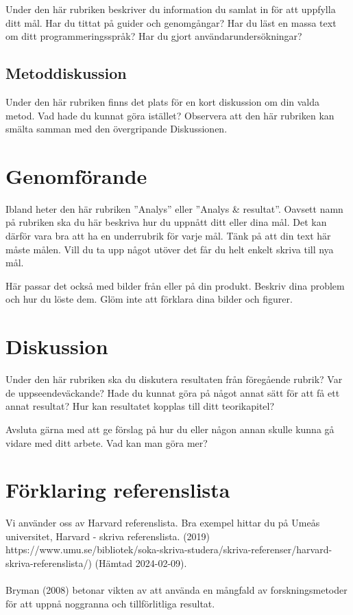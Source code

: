 \documentclass[12pt]{article}
\begin{document}
Under den här rubriken beskriver du information du samlat in för att uppfylla ditt mål. Har du tittat på guider och genomgångar? Har du läst en massa text om ditt programmeringsspråk? Har du gjort användarundersökningar?


\subsection{Metoddiskussion}

Under den här rubriken finns det plats för en kort diskussion om din valda metod. Vad hade du kunnat göra istället? Observera att den här rubriken kan smälta samman med den övergripande Diskussionen. 



\newpage
\section{Genomförande}

Ibland heter den här rubriken ”Analys” eller ”Analys \& resultat”. Oavsett namn på rubriken ska du här beskriva hur du uppnått ditt eller dina mål. Det kan därför vara bra att ha en underrubrik för varje mål. Tänk på att din text här måste målen. Vill du ta upp något utöver det får du helt enkelt skriva till nya mål. 

Här passar det också med bilder från eller på din produkt. Beskriv dina problem och hur du löste dem. Glöm inte att förklara dina bilder och figurer. 



\newpage
\section{Diskussion}

Under den här rubriken ska du diskutera resultaten från föregående rubrik? Var de uppseendeväckande? Hade du kunnat göra på något annat sätt för att få ett annat resultat? Hur kan resultatet kopplas till ditt teorikapitel? 

Avsluta gärna med att ge förslag på hur du eller någon annan skulle kunna gå vidare med ditt arbete. Vad kan man göra mer?



\newpage
\section{Förklaring referenslista}

Vi använder oss av Harvard referenslista. Bra exempel hittar du på Umeås universitet, Harvard - skriva referenslista. (2019) https://www.umu.se/bibliotek/soka-skriva-studera/skriva-referenser/harvard-skriva-referenslista/) (Hämtad 2024-02-09). \cite{Umeå}
\\
\\
Bryman (2008) \cite{Social} betonar vikten av att använda en mångfald av forskningsmetoder för att uppnå noggranna och tillförlitliga resultat.

\printbibliography
\end{document}
